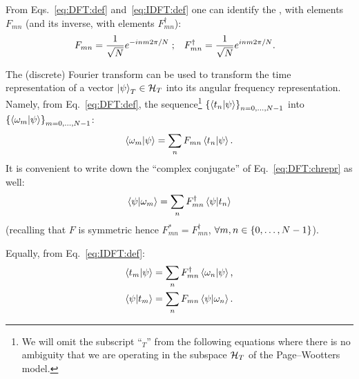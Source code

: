 From Eqs.~\eqref{eq:DFT:def} and~\eqref{eq:IDFT:def} one can identify the
, with elements $F_{mn}$
(and its inverse,
with elements $F_{mn}^{\dagger}$):
\begin{align}\label{eq:pw:F_mn:def}
  F_{mn}            &= \frac{1}{\sqrt{N}} e^{-i n m 2 \pi / N} \;\text{;} &
  F_{mn}^{\dagger}  &= \frac{1}{\sqrt{N}} e^{ i n m 2 \pi / N}
  \text{.}
\end{align}


The (discrete) Fourier transform can be used to transform the time representation
of a vector $\ket{\psi}_T \in \mathcal{H}_T$ into its angular frequency representation.
Namely, from Eq.~\eqref{eq:DFT:def}, the sequence\footnote{
  We will omit the subscript ``${}_{T}$'' from the following equations
  where there is no ambiguity that
  we are operating in the subspace $\mathcal{H}_T$
  of the Page--Wootters model.
}
$\left\{\braket{t_n}{\psi}\right\}_{n=0, \dots, N-1}$ into
$\left\{\braket{\omega_m}{\psi}\right\}_{m=0, \dots, N-1}$:
\begin{equation}\label{eq:DFT:chrepr}
  \braket{\omega_{m}}{\psi} = \sum_n F_{mn} \braket{t_n}{\psi} \text{.}
\end{equation}
It is convenient to write down the ``complex conjugate'' of Eq.~\eqref{eq:DFT:chrepr} as well:
\begin{equation}\label{eq:DFT:chrepr:cconj}
  \braket{\psi}{\omega_{m}} = \sum_n F_{mn}^{\dagger} \braket{\psi}{t_n}
\end{equation}
(recalling that $F$ is symmetric hence
$F_{mn}^{*} = F_{mn}^{\dagger}$,
$\forall m,n \in \left\{0, \dots, N-1\right\}$).

Equally, from Eq.~\eqref{eq:IDFT:def}:
\begin{align}
  \label{eq:IDFT:chrepr}
  \braket{t_{m}}{\psi} &= \sum_n F^{\dagger}_{mn} \braket{\omega_n}{\psi} \text{,} \\
  \label{eq:IDFT:chrepr:cconj}
  \braket{\psi}{t_{m}} &= \sum_n F_{mn} \braket{\psi}{\omega_n} \text{.}
\end{align}

